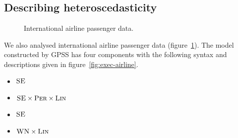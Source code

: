 \documentclass{article}
\begin{document}
\subsection{Describing heteroscedasticity}
\label{sec:airline}

\begin{figure}[h]
\centering
{}
\caption{
International airline passenger data.}
\label{fig:airline}
\end{figure}

We also analysed international airline passenger data (figure~\ref{fig:airline}).
The model constructed by GPSS has four components with the following syntax and descriptions given in figure~\ref{fig:exec-airline}.
\begin{itemize}
  \item ${\textsc{SE}}$
  \item ${\textsc{SE}} \times {\textsc{Per}} \times {\textsc{Lin}}$
  \item ${\textsc{SE}}$
  \item ${\textsc{WN}} \times {\textsc{Lin}}$
\end{itemize}
\end{document}
